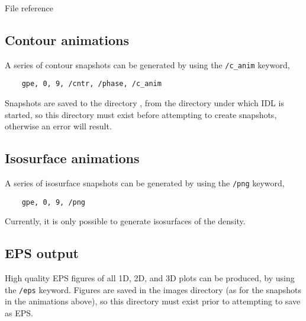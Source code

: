 \begin{chapter}{\label{cha:file_reference}File reference}
  \subsection{Contour animations}
  A series of contour snapshots can be generated by using the \verb"/c_anim"
  keyword, \eg
  \begin{Verbatim}
    gpe, 0, 9, /cntr, /phase, /c_anim
  \end{Verbatim}
  Snapshots are saved to the directory , from the directory
  under which IDL is started, so this directory must exist before attempting to
  create snapshots, otherwise an error will result.

  \subsection{Isosurface animations}
  A series of isosurface snapshots can be generated by using the \verb"/png"
  keyword, \eg
  \begin{Verbatim}
    gpe, 0, 9, /png
  \end{Verbatim}
  Currently, it is only possible to generate isosurfaces of the density.

  \subsection{EPS output}
  High quality EPS figures of all 1D, 2D, and 3D plots can be produced, by
  using the \verb"/eps" keyword.  Figures are saved in the images directory (as
  for the snapshots in the animations above), so this directory must exist
  prior to attempting to save as EPS.

\end{chapter}

